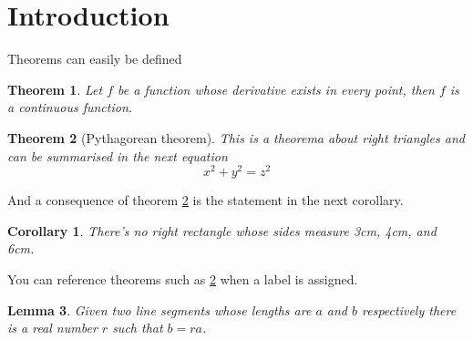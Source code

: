 \documentclass{article}
\newtheorem{theorem}{Theorem}[section]
\newtheorem{corollary}{Corollary}[theorem]
\newtheorem{lemma}[theorem]{Lemma}
\begin{document}
	\section{Introduction}
	Theorems can easily be defined
	
	\begin{theorem}
		Let $f$ be a function whose derivative exists in every point, then $f$ is 
		a continuous function.
	\end{theorem}
	
	\begin{theorem}[Pythagorean theorem]
		\label{pythagorean}
		This is a theorema about right triangles and can be summarised in the next 
		equation		\[ x^2 + y^2 = z^2 \]
	\end{theorem}
	
	And a consequence of theorem \ref{pythagorean} is the statement in the next 
	corollary.
	
	\begin{corollary}
		There's no right rectangle whose sides measure 3cm, 4cm, and 6cm.
	\end{corollary}
	
	You can reference theorems such as \ref{pythagorean} when a label is assigned.
	
	\begin{lemma}
		Given two line segments whose lengths are $a$ and $b$ respectively there is a 
		real number $r$ such that $b=ra$.
	\end{lemma}
\end{document}
